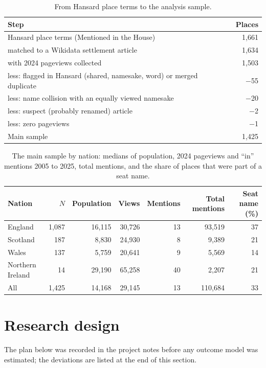 \documentclass[11pt,a4paper]{article}
\begin{document}
\begin{table}[tbp]\centering\small\caption{From Hansard place terms to the analysis sample.}\label{tab:flow}\begin{tabular}{lr}\toprule Step & Places\\\midrule
Hansard place terms (Mentioned in the House) & 1,661\\
\quad matched to a Wikidata settlement article & 1,634\\
\quad with 2024 pageviews collected & 1,503\\
\quad less: flagged in Hansard (shared, namesake, word) or merged duplicate & $-$55\\
\quad less: name collision with an equally viewed namesake & $-$20\\
\quad less: suspect (probably renamed) article & $-$2\\
\quad less: zero pageviews & $-$1\\\midrule
Main sample & 1,425\\\bottomrule\end{tabular}\end{table}
\begin{table}[tbp]\centering\small\caption{The main sample by nation: medians of population, 2024 pageviews and ``in'' mentions 2005 to 2025, total mentions, and the share of places that were part of a seat name.}\label{tab:desc}\begin{tabular}{lrrrrrr}\toprule Nation & $N$ & Population & Views & Mentions & Total mentions & Seat name (\%)\\\midrule
England & 1,087 & 16,115 & 30,726 & 13 & 93,519 & 37\\
Scotland & 187 & 8,830 & 24,930 & 8 & 9,389 & 21\\
Wales & 137 & 5,759 & 20,641 & 9 & 5,569 & 14\\
Northern Ireland & 14 & 29,190 & 65,258 & 40 & 2,207 & 21\\
\midrule
All & 1,425 & 14,168 & 29,145 & 13 & 110,684 & 33\\
\bottomrule\end{tabular}\end{table}

\section{Research design}
\label{sec:design}
The plan below was recorded in the project notes before any outcome model was estimated; the deviations are listed at the end of this section.
\end{document}
